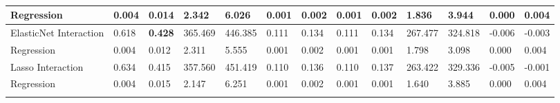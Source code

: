 \documentclass{article}
\begin{document}
{\begin{longtable}[c]{|p{2.3cm}|ll|ll|ll|ll|ll|ll|}
  Regression & \multicolumn{1}{l|}{0.004} & 0.014 & \multicolumn{1}{l|}{2.342}   & 6.026   & \multicolumn{1}{l|}{0.001} & 0.002 & \multicolumn{1}{l|}{0.001} & 0.002 & \multicolumn{1}{l|}{1.836}   & 3.944   & \multicolumn{1}{l|}{0.000}  & 0.004  \\ \hline
  ElasticNet Interaction & \multicolumn{1}{l|}{0.618} & \textbf{0.428} & \multicolumn{1}{l|}{365.469} & 446.385 & \multicolumn{1}{l|}{0.111} & 0.134 & \multicolumn{1}{l|}{0.111} & 0.134 & \multicolumn{1}{l|}{267.477} & 324.818 & \multicolumn{1}{l|}{-0.006} & -0.003 \\
  Regression & \multicolumn{1}{l|}{0.004} & 0.012 & \multicolumn{1}{l|}{2.311}   & 5.555   & \multicolumn{1}{l|}{0.001} & 0.002 & \multicolumn{1}{l|}{0.001} & 0.001 & \multicolumn{1}{l|}{1.798}   & 3.098   & \multicolumn{1}{l|}{0.000}  & 0.004  \\ \hline
  Lasso Interaction & \multicolumn{1}{l|}{0.634} & 0.415 & \multicolumn{1}{l|}{357.560} & 451.419 & \multicolumn{1}{l|}{0.110} & 0.136 & \multicolumn{1}{l|}{0.110} & 0.137 & \multicolumn{1}{l|}{263.422} & 329.336 & \multicolumn{1}{l|}{-0.005} & -0.001 \\
  Regression & \multicolumn{1}{l|}{0.004} & 0.015 & \multicolumn{1}{l|}{2.147}   & 6.251   & \multicolumn{1}{l|}{0.001} & 0.002 & \multicolumn{1}{l|}{0.001} & 0.001 & \multicolumn{1}{l|}{1.640}   & 3.885   & \multicolumn{1}{l|}{0.000}  & 0.004  \\ \hline
  \caption{}
  \label{tab:my-table}\\
  \end{longtable}}

\printbibliography
\end{document}
